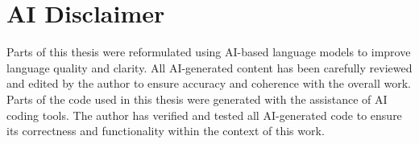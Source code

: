 \newpage
\section*{AI Disclaimer}
\thispagestyle{empty}
Parts of this thesis were reformulated using AI-based language models to improve language quality and clarity. All AI-generated content has been carefully reviewed and edited by the author to ensure accuracy and coherence with the overall work.
\vspace{\baselineskip}
Parts of the code used in this thesis were generated with the assistance of AI coding tools. The author has verified and tested all AI-generated code to ensure its correctness and functionality within the context of this work.

